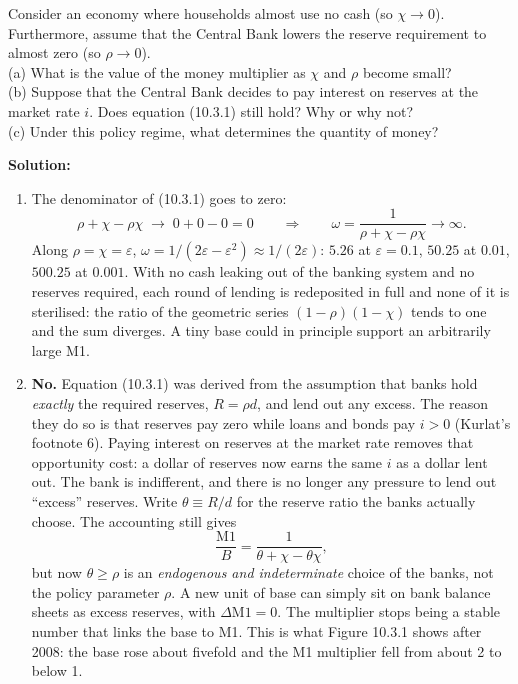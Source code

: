 \documentclass[12pt, letterpaper]{article}
\begin{document}
\begin{tcolorbox}[oddbox,title={Problem 10.3 \quad Interest on Reserves}]
\begin{tcolorbox}[questionbox]
Consider an economy where households almost use no cash (so $\chi\to0$). Furthermore, assume
that the Central Bank lowers the reserve requirement to almost zero (so $\rho\to0$).\\[3pt]
(a) What is the value of the money multiplier as $\chi$ and $\rho$ become small?\\
(b) Suppose that the Central Bank decides to pay interest on reserves at the market rate $i$.
Does equation (10.3.1) still hold? Why or why not?\\
(c) Under this policy regime, what determines the quantity of money?
\end{tcolorbox}

\textbf{Solution:}

\begin{enumerate}
\item The denominator of (10.3.1) goes to zero:
\[
\rho+\chi-\rho\chi\;\longrightarrow\;0+0-0=0
\qquad\Longrightarrow\qquad
\boxed{\omega=\frac{1}{\rho+\chi-\rho\chi}\to\infty.}
\]
Along $\rho=\chi=\varepsilon$, $\omega=1/(2\varepsilon-\varepsilon^2)\approx1/(2\varepsilon)$:
$5.26$ at $\varepsilon=0.1$, $50.25$ at $0.01$, $500.25$ at $0.001$. With no cash leaking out
of the banking system and no reserves required, each round of lending is redeposited in full
and none of it is sterilised: the ratio of the geometric series $(1-\rho)(1-\chi)$ tends to one
and the sum diverges. A tiny base could in principle support an arbitrarily large M1.

\item \textbf{No.} Equation (10.3.1) was derived from the assumption that banks hold
\emph{exactly} the required reserves, $R=\rho d$, and lend out any excess. The reason they do
so is that reserves pay zero while loans and bonds pay $i>0$ (Kurlat's footnote 6). Paying
interest on reserves at the market rate removes that opportunity cost: a dollar of reserves
now earns the same $i$ as a dollar lent out. The bank is indifferent, and there is no longer
any pressure to lend out ``excess'' reserves. Write $\theta\equiv R/d$ for the reserve ratio the
banks actually choose. The accounting still gives
\[
\frac{\text{M1}}{B}=\frac{1}{\theta+\chi-\theta\chi},
\]
but now $\theta\ge\rho$ is an \emph{endogenous and indeterminate} choice of the banks, not the
policy parameter $\rho$. A new unit of base can simply sit on bank balance sheets as excess
reserves, with $\Delta\text{M1}=0$. The multiplier stops being a stable number that links
the base to M1. This is what Figure 10.3.1 shows after 2008: the base rose about fivefold and
the M1 multiplier fell from about 2 to below 1.


\end{enumerate}
\end{tcolorbox}
\end{document}
